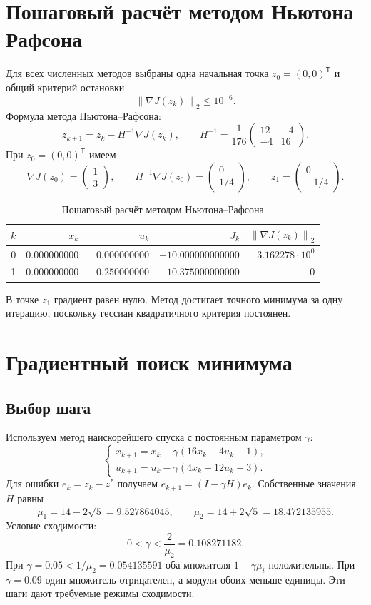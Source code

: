 \documentclass[12pt,a4paper]{article}
\newcommand{\norm}[1]{\left\lVert#1\right\rVert_2}
\begin{document}
\section{Пошаговый расчёт методом Ньютона--Рафсона}
Для всех численных методов выбраны одна начальная точка
$z_0=(0,0)^{\mathsf T}$ и общий критерий остановки
\[
\norm{\nabla J(z_k)}\leq10^{-6}.
\]
Формула метода Ньютона--Рафсона:
\[
z_{k+1}=z_k-H^{-1}\nabla J(z_k),\qquad
H^{-1}=\frac1{176}\begin{pmatrix}12&-4\\-4&16\end{pmatrix}.
\]
При $z_0=(0,0)^{\mathsf T}$ имеем
\[
\nabla J(z_0)=\begin{pmatrix}1\\3\end{pmatrix},\qquad
H^{-1}\nabla J(z_0)=\begin{pmatrix}0\\1/4\end{pmatrix},\qquad
z_1=\begin{pmatrix}0\\-1/4\end{pmatrix}.
\]
\begin{table}[H]\centering
\caption{Пошаговый расчёт методом Ньютона--Рафсона}
\small\setlength{\tabcolsep}{4pt}
\begin{tabular}{r|r|r|r|r}\hline
$k$&$x_k$&$u_k$&$J_k$&$\norm{\nabla J(z_k)}$\\\hline
0 & $0.000000000$ & $0.000000000$ & $-10.000000000000$ & $3.162278\cdot10^{0}$ \\
1 & $0.000000000$ & $-0.250000000$ & $-10.375000000000$ & $0$ \\
\hline\end{tabular}
\end{table}
В точке $z_1$ градиент равен нулю. Метод достигает точного минимума
за одну итерацию, поскольку гессиан квадратичного критерия постоянен.

\section{Градиентный поиск минимума}
\subsection{Выбор шага}
Используем метод наискорейшего спуска с постоянным параметром $\gamma$:
\[
\begin{cases}
x_{k+1}=x_k-\gamma(16x_k+4u_k+1),\\
u_{k+1}=u_k-\gamma(4x_k+12u_k+3).
\end{cases}
\]
Для ошибки $e_k=z_k-z^*$ получаем $e_{k+1}=(I-\gamma H)e_k$.
Собственные значения $H$ равны
\[
\mu_1=14-2\sqrt5=9.527864045,\qquad
\mu_2=14+2\sqrt5=18.472135955.
\]
Условие сходимости:
\[
0<\gamma<\frac2{\mu_2}=0.108271182.
\]
При $\gamma=0.05<1/\mu_2=0.054135591$ оба множителя $1-\gamma\mu_i$
положительны. При $\gamma=0.09$ один множитель отрицателен, а модули
обоих меньше единицы. Эти шаги дают требуемые режимы сходимости.
\newpage
\end{document}
